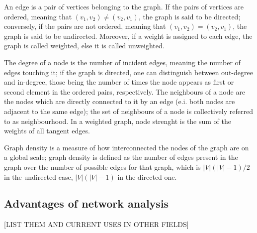 An edge is a pair of vertices belonging to the graph. If the pairs of vertices are ordered, meaning that $(v_1,v_2) \neq (v_2, v_1)$, the graph is said to be directed; conversely, if the pairs are not ordered, meaning that $(v_1,v_2) = (v_2, v_1)$, the graph is said to be undirected. Moreover, if a weight is assigned to each edge, the graph is called weighted, else it is called unweighted.

The degree of a node is the number of incident edges, meaning the number of edges touching it; if the graph is directed, one can distinguish between out-degree and in-degree, those being the number of times the node appears as first or second element in the ordered pairs, respectively. The neighbours of a node are the nodes which are directly connected to it by an edge (e.i. both nodes are adjacent to the same edge); the set of neighbours of a node is collectively referred to as neighbourhood. In a weighted graph, node strenght is the sum of the weights of all tangent edges. 

Graph density is a measure of how interconnected the nodes of the graph are on a global scale; graph density is defined as the number of edges present in the graph over the number of possible edges for that graph, which is $|V|(|V|-1)/2$ in the undirected case, $|V|(|V|-1)$ in the directed one. 

\subsection{Advantages of network analysis}
[LIST THEM AND CURRENT USES IN OTHER FIELDS]

